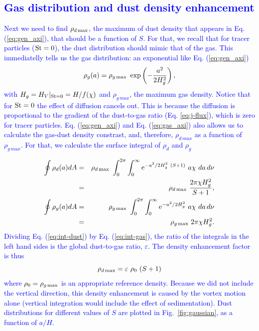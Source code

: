 \documentclass[apj]{emulateapj}
\def\blue#1{\textcolor{blue}{#1}}
\newcommand{\Eq}[1]{Eq. (\ref{#1})}
\newcommand{\eq}[1]{\Eq{#1}}
\newcommand{\eqp}[1]{(Eq. \ref{#1})}
\newcommand{\Fig}[1]{Fig.~\ref{#1}}
\newcommand{\fig}[1]{\Fig{#1}}
\newcommand{\beq}{\begin{equation}}
\newcommand{\eeq}{\end{equation}}
\newcommand{\beqn}{\begin{eqnarray}}
\newcommand{\eeqn}{\end{eqnarray}}
\newcommand{\St}{{\rm St}}
\begin{document}
\blue{\subsection{Gas distribution and dust density enhancement}}

\blue{Next we need to find $\rho_{d\,{\rm max}}$, the maximum of dust
  density that appears in \eq{eq:gen_axi}, that should be a function
  of $S$. For that, we recall that for tracer particles ($\St=0$), the dust distribution should
  mimic that of the gas. This immediatelly tells us the gas
  distribution: an exponential like \eq{eq:gen_axi}
\beq
\rho_g(a) = \rho_{g\,{\rm max}} \ \exp\left(-\frac{a^2}{2H_g^2}\right), \label{eq:gas_axi}
\eeq
\noindent with $H_g = {H_V}{\vert_{\St=0}} = H/f(\chi)$ and $\rho_{g\,max}$, the maximum gas density.  
Notice that for $\St=0$ the effect of diffusion cancels out. This is because
the diffusion is proportional to the gradient of the dust-to-gas
ratio \eqp{eq:j-flux}, which is zero for tracer
particles. \eq{eq:gen_axi} and \eq{eq:gas_axi} also allows us to calculate the gas-dust
density constrast, and, therefore, $\rho_{d\,max}$ as a function of
$\rho_{g\,max}$. For that, we calculate the surface integral of $\rho_d$
and $\rho_g$}

\blue{
\beqn
\oint\rho_d(a) dA  &=& \rho_{d\,{\rm max}} \ \int_0^{2\pi}\int_0^\infty {\rm e}^{-a^2/2H_g^2 \ (S+1)} \ a\chi \ da\,d\nu\notag\\
&=& \rho_{d\,{\rm max}} \ \frac{2\pi \chi H_g^2}{S+1}, \label{eq:int-dust}\\ 
\oint\rho_g(a) dA  &=& \rho_{g\,{\rm max}} \ \int_0^{2\pi}\int_0^\infty {\rm e}^{-a^2/2H_g^2} \ a\chi \ da\,d\nu\notag\\
 &=& \rho_{g\,{\rm max}} \ 2\pi \chi H_g^2. \label{eq:int-gas}\\
\eeqn \noindent Dividing \eq{eq:int-dust} by \eq{eq:int-gas}, the
ratio of the integrals in the left hand sides is the global dust-to-gas
ratio, $\varepsilon$. The density enhancement factor is thus 
\beq
  \rho_{d\,{\rm max}} =  \varepsilon \ \rho_0 \ (S+1) 
\eeq where $\rho_0=\rho_{g\,{\rm max}}$ is an appropriate reference
density. Because we did not include the vertical direction, this
density enhancement is caused by the vortex motion alone (vertical
integration would include the effect of sedimentation). Dust
distributions for different values of \blue{$S$} are plotted in \fig{fig:gaussian}, as a 
function of $a/H$.}
\end{document}
